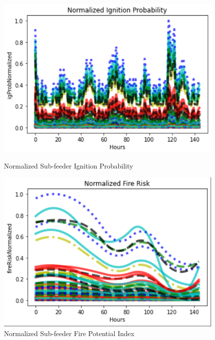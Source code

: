 \documentclass{article}
\begin{document}
\begin{figure}[H]
    \centering
    \begin{minipage}{0.4\textwidth}
        \centering
        \includegraphics[width=1\textwidth]{IgnitionProb.png}
        \caption{Normalized Sub-feeder Ignition Probability}
    \end{minipage}\hfill
    \begin{minipage}{0.4\textwidth}
        \centering
        \includegraphics[width=1\textwidth]{FireRisk.png}
        \caption{Normalized Sub-feeder Fire Potential Index}
    \end{minipage}
\end{figure}
\end{document}
